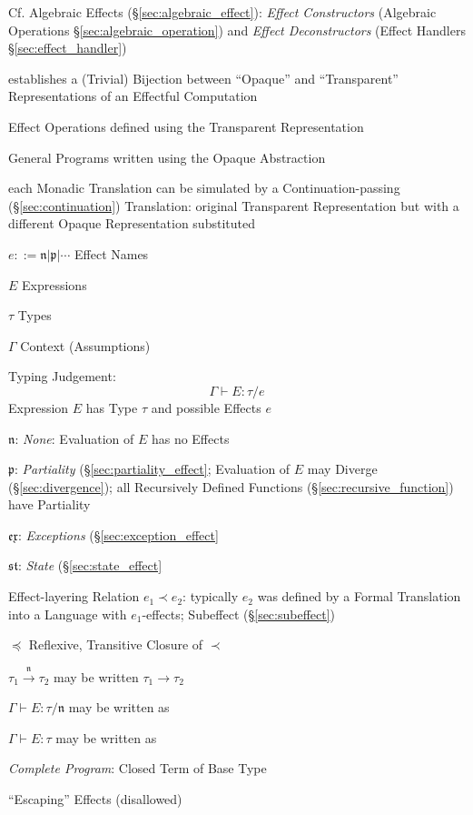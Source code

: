 \fist Cf. Algebraic Effects (\S\ref{sec:algebraic_effect}):
\emph{Effect Constructors} (Algebraic Operations
\S\ref{sec:algebraic_operation}) and \emph{Effect Deconstructors}
(Effect Handlers \S\ref{sec:effect_handler})


establishes a (Trivial) Bijection between ``Opaque'' and
``Transparent'' Representations of an Effectful Computation

Effect Operations defined using the Transparent Representation

General Programs written using the Opaque Abstraction

each Monadic Translation can be simulated by a Continuation-passing
(\S\ref{sec:continuation}) Translation: original Transparent
Representation but with a different Opaque Representation substituted

$e ::= \mathfrak{n} | \mathfrak{p} | \cdots$ Effect Names

$E$ Expressions

$\tau$ Types

$\Gamma$ Context (Assumptions)

Typing Judgement:
\[
  \Gamma \vdash E : \tau / e
\]
Expression $E$ has Type $\tau$ and possible Effects $e$

$\mathfrak{n}$: \emph{None}: Evaluation of $E$ has no Effects

$\mathfrak{p}$: \emph{Partiality} (\S\ref{sec:partiality_effect};
Evaluation of $E$ may Diverge (\S\ref{sec:divergence}); all
Recursively Defined Functions (\S\ref{sec:recursive_function}) have
Partiality

$\mathfrak{ex}$: \emph{Exceptions} (\S\ref{sec:exception_effect}

$\mathfrak{st}$: \emph{State} (\S\ref{sec:state_effect}

Effect-layering Relation $e_1 \prec e_2$: typically $e_2$ was defined
by a Formal Translation into a Language with $e_1$-effects; Subeffect
(\S\ref{sec:subeffect})

$\preceq$ Reflexive, Transitive Closure of $\prec$

$\tau_1 \xrightarrow{\mathfrak{n}} \tau_2$ may be written $\tau_1
\rightarrow \tau_2$

$\Gamma \vdash E : \tau / \mathfrak{n}$ may be written as

$\Gamma \vdash E : \tau$ may be written as

\emph{Complete Program}: Closed Term of Base Type

``Escaping'' Effects (disallowed)

